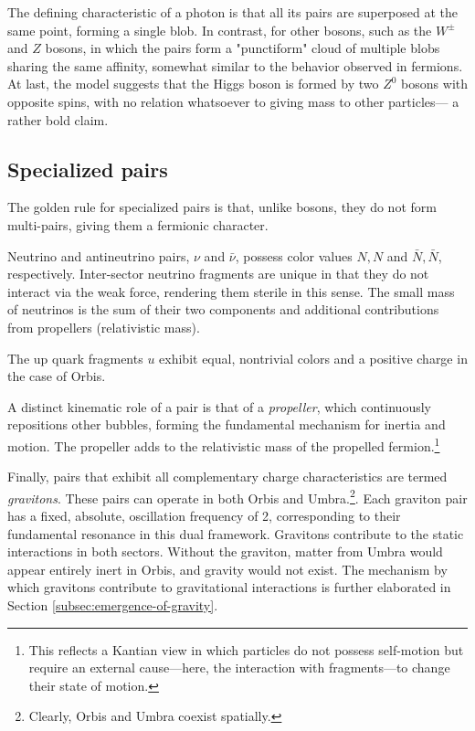 \documentclass[12pt,english]{article}
\begin{document}
The defining characteristic of a photon is that all its pairs are superposed at the same point, forming a single blob. In contrast, for other bosons, such as the $W^{\pm}$ and $Z$ bosons, in which the pairs form a "punctiform" cloud of multiple blobs sharing the same affinity, somewhat similar to the behavior observed in fermions. At last, the model suggests that the Higgs boson is formed by two $Z^0$ bosons with opposite spins, with no relation whatsoever to giving mass to other particles— a rather bold claim.

\subsection{Specialized pairs} \label{subsec:specialized-pairs}

The golden rule for specialized pairs is that, unlike bosons, they do not form multi-pairs, giving them a fermionic character.

Neutrino and antineutrino pairs, $\nu$ and $\bar{\nu}$, possess color values $N, N$ and $\bar{N}, \bar{N}$, respectively. Inter-sector neutrino fragments are unique in that they do not interact via the weak force, rendering them sterile in this sense. The small mass of neutrinos is the sum of their two components and additional contributions from propellers (relativistic mass).

The up quark fragments $u$ exhibit equal, nontrivial colors and a positive charge in the case of Orbis. 

A distinct kinematic role of a pair is that of a \textit{propeller}, which continuously repositions other bubbles, forming the fundamental mechanism for inertia and motion. The propeller adds to the relativistic mass of the propelled fermion.\footnote{This reflects a Kantian view in which particles do not possess self-motion but require an external cause—here, the interaction with fragments—to change their state of motion.}

Finally, pairs that exhibit all complementary charge characteristics are termed \emph{gravitons}. These pairs can operate in both Orbis and Umbra.\footnote{Clearly, Orbis and Umbra coexist spatially.}. Each graviton pair has a fixed, absolute, oscillation frequency of 2, corresponding to their fundamental resonance in this dual framework. Gravitons contribute to the static interactions in both sectors. Without the graviton, matter from Umbra would appear entirely inert in Orbis, and gravity would not exist. The mechanism by which gravitons contribute to gravitational interactions is further elaborated in Section \ref{subsec:emergence-of-gravity}.
\end{document}
